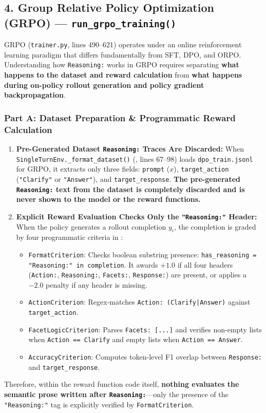 \documentclass[10pt,letterpaper]{article}
\begin{document}
\vspace{6pt}
\subsection{4. Group Relative Policy Optimization (GRPO) --- \texttt{run\_grpo\_training()}}

GRPO (\texttt{trainer.py}, lines 490--621) operates under an online reinforcement learning paradigm that differs fundamentally from SFT, DPO, and ORPO. Understanding how \texttt{Reasoning:} works in GRPO requires separating \textbf{what happens to the dataset and reward calculation} from \textbf{what happens during on-policy rollout generation and policy gradient backpropagation}.

\subsubsection*{Part A: Dataset Preparation \& Programmatic Reward Calculation}
\begin{enumerate}[leftmargin=18pt, itemsep=3pt]
    \item \textbf{Pre-Generated Dataset \texttt{Reasoning:} Traces Are Discarded:} When \texttt{SingleTurnEnv.\_format\_dataset()} (, lines 67--98) loads \texttt{dpo\_train.jsonl} for GRPO, it extracts only three fields: \texttt{prompt} ($x$), \texttt{target\_action} (\texttt{"Clarify"} or \texttt{"Answer"}), and \texttt{target\_response}. \textbf{The pre-generated \texttt{Reasoning:} text from the dataset is completely discarded and is never shown to the model or the reward functions.}
    \item \textbf{Explicit Reward Evaluation Checks Only the \texttt{"Reasoning:"} Header:} When the policy generates a rollout completion $y_i$, the completion is graded by four programmatic criteria in :
    \begin{itemize}[leftmargin=16pt, itemsep=1pt]
        \item \texttt{FormatCriterion}: Checks boolean substring presence:
        \texttt{has\_reasoning = "Reasoning:" in completion}. It awards $+1.0$ if all four headers (\texttt{Action:}, \texttt{Reasoning:}, \texttt{Facets:}, \texttt{Response:}) are present, or applies a $-2.0$ penalty if any header is missing.
        \item \texttt{ActionCriterion}: Regex-matches \texttt{Action: (Clarify|Answer)} against \texttt{target\_action}.
        \item \texttt{FacetLogicCriterion}: Parses \texttt{Facets: [...]} and verifies non-empty lists when \texttt{Action == Clarify} and empty lists when \texttt{Action == Answer}.
        \item \texttt{AccuracyCriterion}: Computes token-level F1 overlap between \texttt{Response:} and \texttt{target\_response}.
    \end{itemize}
\end{enumerate}
Therefore, within the reward function code itself, \textbf{nothing evaluates the semantic prose written after \texttt{Reasoning:}}---only the presence of the \texttt{"Reasoning:"} tag is explicitly verified by \texttt{FormatCriterion}.
\end{document}
